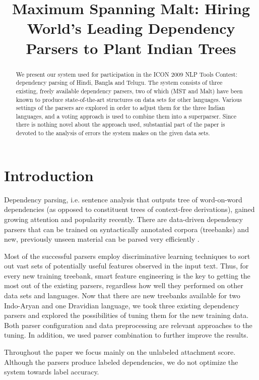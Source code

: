\documentclass[11pt]{article}
\title{Maximum Spanning Malt: Hiring World's Leading Dependency Parsers to Plant Indian Trees%
}
\author{%
}
\date{}
\begin{document}
\maketitle
\thispagestyle{fancy}

\begin{abstract}
We present our system used for participation in the ICON 2009 NLP Tools Contest: dependency parsing of Hindi, Bangla and Telugu. The system consists of three existing, freely available dependency parsers, two of which (MST and Malt) have been known to produce state-of-the-art structures on data sets for other languages. Various settings of the parsers are explored in order to adjust them for the three Indian languages, and a voting approach is used to combine them into a superparser. Since there is nothing novel about the approach used, substantial part of the paper is devoted to the analysis of errors the system makes on the given data sets.
\end{abstract}

\section{Introduction}
\label{sec:intro}

Dependency parsing, i.e. sentence analysis that outputs tree of word-on-word dependencies (as opposed to constituent trees of context-free derivations), gained growing attention and popularity recently. There are data-driven dependency parsers that can be trained on syntactically annotated corpora (treebanks) and new, previously unseen material can be parsed very efficiently \citep{nivre:2009:ACLIJCNLP}.

Most of the successful parsers employ discriminative learning techniques to sort out vast sets of potentially useful features observed in the input text. Thus, for every new training treebank, smart feature engineering is the key to getting the most out of the existing parsers, regardless how well they performed on other data sets and languages. Now that there are new treebanks available for two Indo-Aryan and one Dravidian language, we took three existing dependency parsers and explored the possibilities of tuning them for the new training data. Both parser configuration and data preprocessing are relevant approaches to the tuning. In addition, we used parser combination to further improve the results.

Throughout the paper we focus mainly on the unlabeled attachment score. Although the parsers produce labeled dependencies, we do not optimize the system towards label accuracy.
\end{document}
